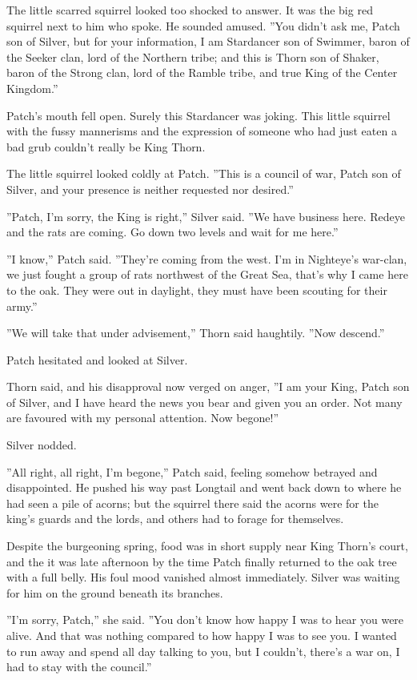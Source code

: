 \documentclass[12pt]{book}
\begin{document}
The little scarred squirrel looked too shocked to answer. It was the
big red squirrel next to him who spoke. He sounded amused. ''You
didn't ask me, Patch son of Silver, but for your information, I am
Stardancer son of Swimmer, baron of the Seeker clan, lord of the
Northern tribe; and this is Thorn son of Shaker, baron of the Strong
clan, lord of the Ramble tribe, and true King of the Center Kingdom.''

Patch's mouth fell open. Surely this Stardancer was joking. This
little squirrel with the fussy mannerisms and the expression of
someone who had just eaten a bad grub couldn't really be King Thorn.

The little squirrel looked coldly at Patch. ''This is a council of
war, Patch son of Silver, and your presence is neither requested nor
desired.''

''Patch, I'm sorry, the King is right,'' Silver said. ''We have
business here. Redeye and the rats are coming. Go down two levels and
wait for me here.''

''I know,'' Patch said. ''They're coming from the west. I'm in
Nighteye's war-clan, we just fought a group of rats northwest of the
Great Sea, that's why I came here to the oak. They were out in
daylight, they must have been scouting for their army.''

''We will take that under advisement,'' Thorn said haughtily. ''Now
descend.''

Patch hesitated and looked at Silver.

Thorn said, and his disapproval now verged on anger, ''I am your King,
Patch son of Silver, and I have heard the news you bear and given you
an order. Not many are favoured with my personal attention. Now
begone!''

Silver nodded.

''All right, all right, I'm begone,'' Patch said, feeling somehow
betrayed and disappointed. He pushed his way past Longtail and went
back down to where he had seen a pile of acorns; but the squirrel
there said the acorns were for the king's guards and the lords, and
others had to forage for themselves.

Despite the burgeoning spring, food was in short supply near King
Thorn's court, and the it was late afternoon by the time Patch finally
returned to the oak tree with a full belly. His foul mood vanished
almost immediately. Silver was waiting for him on the ground beneath
its branches.

''I'm sorry, Patch,'' she said. ''You don't know how happy I was to
hear you were alive. And that was nothing compared to how happy I was
to see you. I wanted to run away and spend all day talking to you, but
I couldn't, there's a war on, I had to stay with the council.''
\end{document}

